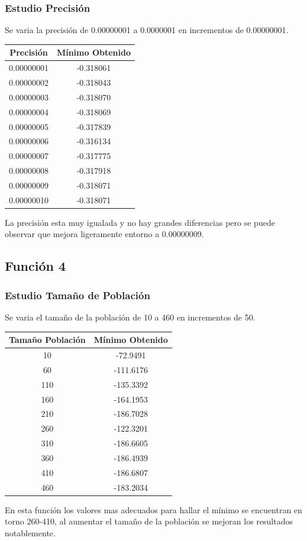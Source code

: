 \documentclass[12pt]{article}
\begin{document}
\subsubsection*{Estudio Precisión}
	Se varia la precisión de 0.00000001 a 0.0000001 en incrementos de 0.00000001.
\begin{table}[H]
\begin{center}
\begin{tabular}{|cc|} \hline
Precisión & Mínimo Obtenido \\  \hline
0.00000001 & -0.318061 \\ 
0.00000002 & -0.318043 \\ 
0.00000003 & -0.318070 \\
0.00000004 & -0.318069 \\
0.00000005 & -0.317839 \\
0.00000006 & -0.316134 \\
0.00000007 & -0.317775 \\
0.00000008 & -0.317918 \\ 
0.00000009 & -0.318071 \\
0.00000010 & -0.318071 \\  \hline
\end{tabular}
\end{center}
\end{table}
	La precisión esta muy igualada y no hay grandes diferencias pero se puede observar que mejora ligeramente entorno a 0.00000009.

\subsection{Función 4}
\subsubsection*{Estudio Tamaño de Población}
	Se varia el tamaño de la población de 10 a 460 en incrementos de 50.
\begin{table}[H]
\begin{center}
\begin{tabular}{|cc|} \hline
Tamaño Población & Mínimo Obtenido \\  \hline
10  & -72.9491 \\ 
60  & -111.6176 \\ 
110 & -135.3392 \\
160 & -164.1953 \\
210 & -186.7028 \\
260 & -122.3201 \\
310 & -186.6605 \\
360 & -186.4939 \\ 
410 & -186.6807 \\
460 & -183.2034 \\  \hline
\end{tabular}
\end{center}
\end{table}
	En esta función los valores mas adecuados para hallar el mínimo se encuentran en torno 260-410, al aumentar el tamaño de la población se mejoran los resultados notablemente. 
\end{document}
